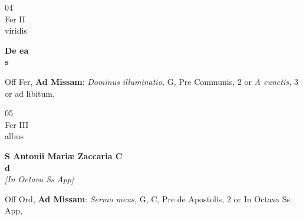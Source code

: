\documentclass[10pt, openany]{book}
\begin{document}
        \begin{center}
            \begin{minipage}{3.5in}
                \vspace{2em}
                \begin{minipage}{0.5in}
                    {\Huge 04} \\
                    {\normalsize Fer II} \\
                    {\normalsize viridis}
                \end{minipage}
                \begin{minipage}{3.0in}
                    \textbf{ \large De ea \\
                    \textnormal{\normalsize s}} \\ 
                \end{minipage}
                \begin{justify}Off Fer, \textbf{Ad Missam}: \textit{Dominus illuminatio,} G, Pre Communis, 2 or \textit{A cunctis,} 3 or ad libitum,  
                \end{justify}
            \end{minipage}
        \end{center}
    
        \begin{center}
            \begin{minipage}{3.5in}
                \vspace{2em}
                \begin{minipage}{0.5in}
                    {\Huge 05} \\
                    {\normalsize Fer III} \\
                    {\normalsize albus}
                \end{minipage}
                \begin{minipage}{3.0in}
                    \textbf{ \large S Antonii Mariæ Zaccaria C \\
                    \textnormal{\normalsize d}} \\ \textit{[In Octava Ss App]} \\ 
                \end{minipage}
                \begin{justify}Off Ord, \textbf{Ad Missam}: \textit{Sermo meus,} G, C, Pre de Apostolis, 2 or In Octava Ss App,  
                \end{justify}
            \end{minipage}
        \end{center}
    
\end{document}
